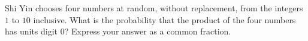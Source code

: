 Shi Yin chooses four numbers at random, without replacement, from the integers $1$ to $10$ inclusive. What is the probability that the product of the four numbers has units digit $0$? Express your answer as a common fraction.
